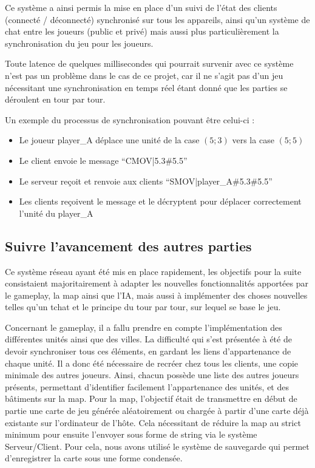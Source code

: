 \documentclass[12pt]{report}
\begin{document}
Ce système a ainsi permis la mise en place d’un suivi de l’état des clients
(connecté / déconnecté) synchronisé sur tous les appareils, ainsi qu’un système
de chat entre les joueurs (public et privé) mais aussi plus particulièrement la
synchronisation du jeu pour les joueurs.

Toute latence de quelques millisecondes qui pourrait survenir avec ce système
n’est pas un problème dans le cas de ce projet, car il ne s’agit pas d’un jeu
nécessitant une synchronisation en temps réel étant donné que les parties se
déroulent en tour par tour.

Un exemple du processus de synchronisation pouvant être celui-ci :

\begin{itemize}
    \item Le joueur player\_A déplace une unité de la case $(5; 3)$ vers la case
        $(5; 5)$
    \item Le client envoie le message “CMOV|5.3\#5.5”
    \item Le serveur reçoit et renvoie aux clients “SMOV|player\_A\#5.3\#5.5”
    \item Les clients reçoivent le message et le décryptent pour déplacer
        correctement  l’unité du player\_A
\end{itemize}

\subsection{Suivre l’avancement des autres parties}

Ce système réseau ayant été mis en place rapidement, les objectifs pour la suite
consistaient majoritairement à adapter les nouvelles fonctionnalités apportées
par le gameplay, la map ainsi que l’IA, mais aussi à implémenter des choses
nouvelles telles qu’un tchat et le principe du tour par tour, sur lequel se base
le jeu.

Concernant le gameplay, il a fallu prendre en compte l’implémentation des
différentes unités ainsi que des villes. La difficulté qui s’est présentée à été
de devoir synchroniser tous ces éléments, en gardant les liens d’appartenance de
chaque unité. Il a donc été nécessaire de recréer chez tous les clients, une
copie minimale des autres joueurs. Ainsi, chacun possède une liste des autres
joueurs présents, permettant d’identifier facilement l’appartenance des unités,
et des bâtiments sur la map.  Pour la map, l’objectif était de transmettre en
début de partie une carte de jeu générée aléatoirement ou chargée à partir d’une
carte déjà existante sur l’ordinateur de l’hôte. Cela nécessitant de réduire la
map au strict minimum pour ensuite l’envoyer sous forme de string via le système
Serveur/Client. Pour cela, nous avons utilisé le système de sauvegarde qui
permet d’enregistrer la carte sous une forme condensée. 
\end{document}
